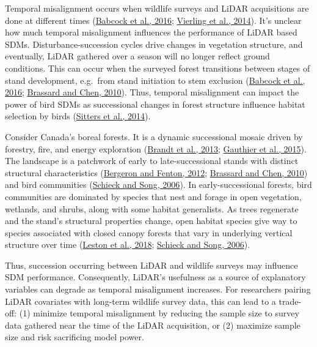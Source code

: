 \documentclass[
  12pt,
]{article}
\begin{document}
Temporal misalignment occurs when wildlife surveys and LiDAR acquisitions are done at different times (\protect\hyperlink{ref-babcockModelingForestBiomass2016}{Babcock et al., 2016}; \protect\hyperlink{ref-VierlingSwift2014}{Vierling et al., 2014}). It's unclear how much temporal misalignment influences the performance of LiDAR based SDMs. Disturbance-succession cycles drive changes in vegetation structure, and eventually, LiDAR gathered over a season will no longer reflect ground conditions. This can occur when the surveyed forest transitions between stages of stand development, e.g.~from stand initiation to stem exclusion (\protect\hyperlink{ref-babcockModelingForestBiomass2016}{Babcock et al., 2016}; \protect\hyperlink{ref-brassardStandStructureComposition2010}{Brassard and Chen, 2010}). Thus, temporal misalignment can impact the power of bird SDMs as successional changes in forest structure influence habitat selection by birds (\protect\hyperlink{ref-sittersAssociationsOccupancyHabitat2014}{Sitters et al., 2014}).

Consider Canada's boreal forests. It is a dynamic successional mosaic driven by forestry, fire, and energy exploration (\protect\hyperlink{ref-Brandt2013}{Brandt et al., 2013}; \protect\hyperlink{ref-gauthierBorealForestHealth2015}{Gauthier et al., 2015}). The landscape is a patchwork of early to late-successional stands with distinct structural characteristics (\protect\hyperlink{ref-Bergeron2012}{Bergeron and Fenton, 2012}; \protect\hyperlink{ref-brassardStandStructureComposition2010}{Brassard and Chen, 2010}) and bird communities (\protect\hyperlink{ref-Schieck2006}{Schieck and Song, 2006}). In early-successional forests, bird communities are dominated by species that nest and forage in open vegetation, wetlands, and shrubs, along with some habitat generalists. As trees regenerate and the stand's structural properties change, open habitat species give way to species associated with closed canopy forests that vary in underlying vertical structure over time (\protect\hyperlink{ref-lestonLongtermChangesBoreal2018}{Leston et al., 2018}; \protect\hyperlink{ref-Schieck2006}{Schieck and Song, 2006}).

Thus, succession occurring between LiDAR and wildlife surveys may influence SDM performance. Consequently, LiDAR's usefulness as a source of explanatory variables can degrade as temporal misalignment increases. For researchers pairing LiDAR covariates with long-term wildlife survey data, this can lead to a trade-off: (1) minimize temporal misalignment by reducing the sample size to survey data gathered near the time of the LiDAR acquisition, or (2) maximize sample size and risk sacrificing model power.
\end{document}

